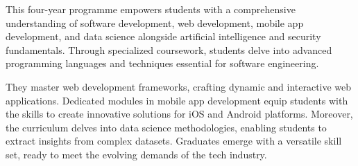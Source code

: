 \documentclass[openany,twoside]{report}
\begin{document}

\enlargethispage{11cm}

\vspace{-1.75cm}
\begin{minipage}{.3\textwidth}\flushleft
This four-year programme empowers students with a comprehensive understanding of software development, web development, mobile app development, and data science alongside artificial intelligence and security fundamentals. Through specialized coursework, students delve into advanced programming languages and techniques essential for software engineering. 

\vspace{0.3cm}
They master web development frameworks, crafting dynamic and interactive web applications. 
Dedicated modules in mobile app development equip students with the skills to create innovative solutions for iOS and Android platforms. 
Moreover, the curriculum delves into data science methodologies, enabling students to extract insights from complex datasets. Graduates emerge with a versatile skill set, ready to meet the evolving demands of the tech industry.

%
%

\end{minipage}
%
\hfill
%
\end{document}
